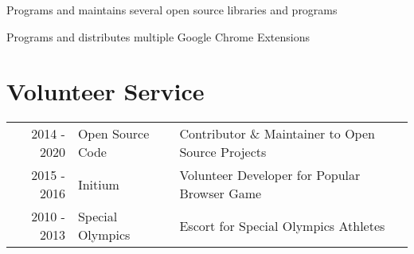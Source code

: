 \documentclass[]{resume}
\begin{document}
\begin{minipage}[t]{0.69\textwidth}
\sectionsep

\descript{}
\begin{tightemize}
\item Programs and maintains several open source libraries and programs
\item Programs and distributes multiple Google Chrome Extensions
\end{tightemize}

\sectionsep




\section{Volunteer Service}
\begin{tabular}{rll}
2014 - 2020 & Open Source Code  & Contributor \& Maintainer to Open Source Projects \\
2015 - 2016 & Initium           & Volunteer Developer for Popular Browser Game \\
2010 - 2013 & Special Olympics  & Escort for Special Olympics Athletes \\
\end{tabular}


\end{minipage}

%
%

\end{document}
